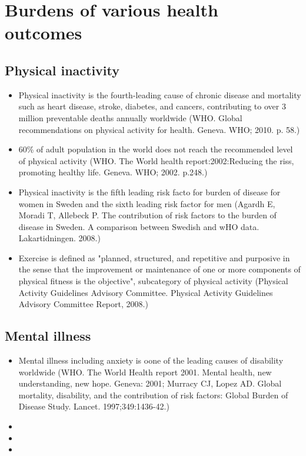 \documentclass{article}
\begin{document}
\section{Burdens of various health outcomes}
\subsection{Physical inactivity}
\begin{itemize}
	\item Physical inactivity is the fourth-leading cause of chronic disease and mortality such as heart disease, stroke, diabetes, and cancers, contributing to over 3 million preventable deaths annually worldwide (WHO. Global recommendations on physical activity for health. Geneva. WHO; 2010. p. 58.)
	\item 60\% of adult population in the world does not reach the recommended level of physical activity (WHO. The World health report:2002:Reducing the riss, promoting healthy life. Geneva. WHO; 2002. p.248.)
	\item Physical inactivity is the fifth leading risk facto for burden of disease for women in Sweden and the sixth leading risk factor for men (Agardh E, Moradi T, Allebeck P. The contribution of risk factors to the burden of disease in Sweden. A comparison between Swedish and wHO data. Lakartidningen. 2008.)
	\item Exercise is defined as "planned, structured, and repetitive and purposive in the sense that the improvement or maintenance of one or more components of physical fitness is the objective", subcategory of physical activity (Physical Activity Guidelines Advisory Committee. Physical Activity Guidelines Advisory Committee Report, 2008.)
\end{itemize}

\subsection{Mental illness}
\begin{itemize}
	\item Mental illness including anxiety is oone of the leading causes of disability worldwide (WHO. The World Health report 2001. Mental health, new understanding, new hope. Geneva: 2001; Murracy CJ, Lopez AD. Global mortality, disability, and the contribution of risk factors: Global Burden of Disease Study. Lancet. 1997;349:1436-42.)
	\item 
	\item 
	\item 
\end{itemize}
\end{document}
